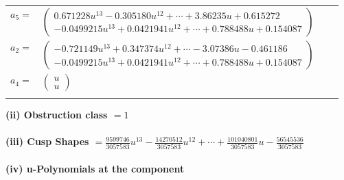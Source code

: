 \documentclass[1p]{elsarticle_modified}
\theoremstyle{definition}
\begin{document}
\begin{tabular}{m{7pt} m{180pt} m{7pt} m{180pt} }
\flushright $a_{5}=$&$\begin{pmatrix}0.671228 u^{13}-0.305180 u^{12}+\cdots+3.86235 u+0.615272\\-0.0499215 u^{13}+0.0421941 u^{12}+\cdots+0.788488 u+0.154087\end{pmatrix}$ \\
\flushright $a_{2}=$&$\begin{pmatrix}-0.721149 u^{13}+0.347374 u^{12}+\cdots-3.07386 u-0.461186\\-0.0499215 u^{13}+0.0421941 u^{12}+\cdots+0.788488 u+0.154087\end{pmatrix}$ \\
\flushright $a_{4}=$&$\begin{pmatrix}u\\u\end{pmatrix}$\\&\end{tabular}
\flushleft \textbf{(ii) Obstruction class $= 1$}\\~\\
\flushleft \textbf{(iii) Cusp Shapes $= \frac{9599746}{3057583} u^{13}-\frac{14270512}{3057583} u^{12}+\cdots+\frac{101040801}{3057583} u-\frac{56545536}{3057583}$}\\~\\
\newpage\renewcommand{\arraystretch}{1}
\flushleft \textbf{(iv) u-Polynomials at the component}\newline \\
\end{document}
